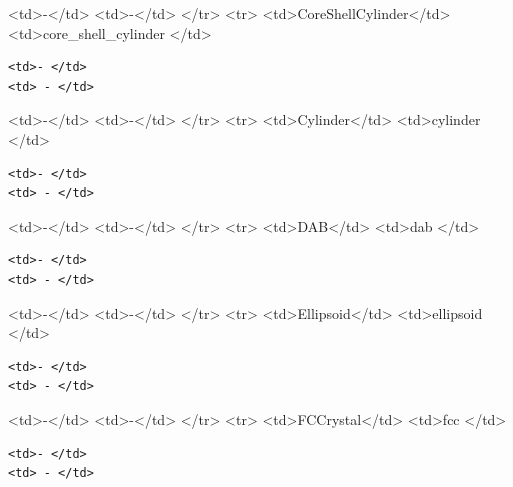 \textless{}td\textgreater{}-\textless{}/td\textgreater{} \textless{}td\textgreater{}-\textless{}/td\textgreater{} \textless{}/tr\textgreater{} \textless{}tr\textgreater{} \textless{}td\textgreater{}CoreShellCylinder\textless{}/td\textgreater{} \textless{}td\textgreater{}core\_shell\_cylinder \textless{}/td\textgreater{}

\begin{verbatim}
<td>- </td>
<td> - </td>
\end{verbatim}

\textless{}td\textgreater{}-\textless{}/td\textgreater{} \textless{}td\textgreater{}-\textless{}/td\textgreater{} \textless{}/tr\textgreater{} \textless{}tr\textgreater{} \textless{}td\textgreater{}Cylinder\textless{}/td\textgreater{} \textless{}td\textgreater{}cylinder \textless{}/td\textgreater{}

\begin{verbatim}
<td>- </td>
<td> - </td>
\end{verbatim}

\textless{}td\textgreater{}-\textless{}/td\textgreater{} \textless{}td\textgreater{}-\textless{}/td\textgreater{} \textless{}/tr\textgreater{} \textless{}tr\textgreater{} \textless{}td\textgreater{}DAB\textless{}/td\textgreater{} \textless{}td\textgreater{}dab \textless{}/td\textgreater{}

\begin{verbatim}
<td>- </td>
<td> - </td>
\end{verbatim}

\textless{}td\textgreater{}-\textless{}/td\textgreater{} \textless{}td\textgreater{}-\textless{}/td\textgreater{} \textless{}/tr\textgreater{} \textless{}tr\textgreater{} \textless{}td\textgreater{}Ellipsoid\textless{}/td\textgreater{} \textless{}td\textgreater{}ellipsoid \textless{}/td\textgreater{}

\begin{verbatim}
<td>- </td>
<td> - </td>
\end{verbatim}

\textless{}td\textgreater{}-\textless{}/td\textgreater{} \textless{}td\textgreater{}-\textless{}/td\textgreater{} \textless{}/tr\textgreater{} \textless{}tr\textgreater{} \textless{}td\textgreater{}FCCrystal\textless{}/td\textgreater{} \textless{}td\textgreater{}fcc \textless{}/td\textgreater{}

\begin{verbatim}
<td>- </td>
<td> - </td>
\end{verbatim}

